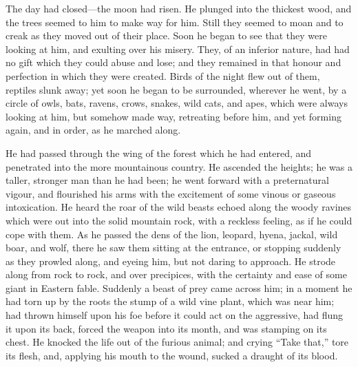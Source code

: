 The day had closed—the moon had risen. He plunged into the
thickest wood, and the trees seemed to him to make way for him. Still
they seemed to moan and to creak as they moved out of their place.
Soon he began to see that they were looking at him, and exulting over
his misery. They, of an inferior nature, had had no gift which they
could abuse and lose; and they remained in that honour and perfection
in which they were created. Birds of the night flew out of them,
reptiles slunk away; yet soon he began to be surrounded, wherever he
went, by a circle of owls, bats, ravens, crows, snakes, wild cats, and
apes, which were always looking at him, but somehow made way,
retreating before him, and yet forming again, and in order, as he
marched along.

He had passed through the wing of the forest which he had entered,
and penetrated into the more mountainous country. He ascended the
heights; he was a taller, stronger man than he had been; he went
forward with a preternatural vigour, and flourished his arms with the
excitement of some vinous or gaseous intoxication. He heard the roar
of the wild beasts echoed along the woody ravines which were out
into the solid mountain rock, with a reckless feeling, as if he could
cope with them. As he passed the dens of the lion, leopard, hyena,
jackal, wild boar, and wolf, there he saw them sitting at the
entrance, or stopping suddenly as they prowled along, and eyeing him,
but not daring to approach. He strode along from rock to rock, and
over precipices, with the certainty and ease of some giant in Eastern
fable. Suddenly a beast of prey came across him; in a moment he had
torn up by the roots the stump of a wild vine plant, which was near
him; had thrown himself upon his foe before it could act on the
aggressive, had flung it upon its back, forced the weapon into its
month, and was stamping on its chest. He knocked the life out of the
furious animal; and crying ``Take that,'' tore its flesh, and,
applying his mouth to the wound, sucked a draught of its blood.

